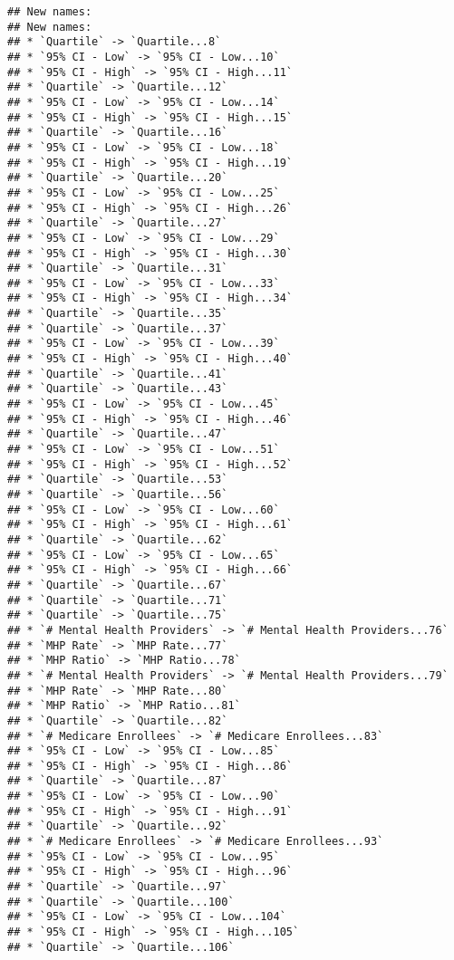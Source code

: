 \documentclass[
]{article}
\begin{document}
\begin{verbatim}
## New names:
## New names:
## * `Quartile` -> `Quartile...8`
## * `95% CI - Low` -> `95% CI - Low...10`
## * `95% CI - High` -> `95% CI - High...11`
## * `Quartile` -> `Quartile...12`
## * `95% CI - Low` -> `95% CI - Low...14`
## * `95% CI - High` -> `95% CI - High...15`
## * `Quartile` -> `Quartile...16`
## * `95% CI - Low` -> `95% CI - Low...18`
## * `95% CI - High` -> `95% CI - High...19`
## * `Quartile` -> `Quartile...20`
## * `95% CI - Low` -> `95% CI - Low...25`
## * `95% CI - High` -> `95% CI - High...26`
## * `Quartile` -> `Quartile...27`
## * `95% CI - Low` -> `95% CI - Low...29`
## * `95% CI - High` -> `95% CI - High...30`
## * `Quartile` -> `Quartile...31`
## * `95% CI - Low` -> `95% CI - Low...33`
## * `95% CI - High` -> `95% CI - High...34`
## * `Quartile` -> `Quartile...35`
## * `Quartile` -> `Quartile...37`
## * `95% CI - Low` -> `95% CI - Low...39`
## * `95% CI - High` -> `95% CI - High...40`
## * `Quartile` -> `Quartile...41`
## * `Quartile` -> `Quartile...43`
## * `95% CI - Low` -> `95% CI - Low...45`
## * `95% CI - High` -> `95% CI - High...46`
## * `Quartile` -> `Quartile...47`
## * `95% CI - Low` -> `95% CI - Low...51`
## * `95% CI - High` -> `95% CI - High...52`
## * `Quartile` -> `Quartile...53`
## * `Quartile` -> `Quartile...56`
## * `95% CI - Low` -> `95% CI - Low...60`
## * `95% CI - High` -> `95% CI - High...61`
## * `Quartile` -> `Quartile...62`
## * `95% CI - Low` -> `95% CI - Low...65`
## * `95% CI - High` -> `95% CI - High...66`
## * `Quartile` -> `Quartile...67`
## * `Quartile` -> `Quartile...71`
## * `Quartile` -> `Quartile...75`
## * `# Mental Health Providers` -> `# Mental Health Providers...76`
## * `MHP Rate` -> `MHP Rate...77`
## * `MHP Ratio` -> `MHP Ratio...78`
## * `# Mental Health Providers` -> `# Mental Health Providers...79`
## * `MHP Rate` -> `MHP Rate...80`
## * `MHP Ratio` -> `MHP Ratio...81`
## * `Quartile` -> `Quartile...82`
## * `# Medicare Enrollees` -> `# Medicare Enrollees...83`
## * `95% CI - Low` -> `95% CI - Low...85`
## * `95% CI - High` -> `95% CI - High...86`
## * `Quartile` -> `Quartile...87`
## * `95% CI - Low` -> `95% CI - Low...90`
## * `95% CI - High` -> `95% CI - High...91`
## * `Quartile` -> `Quartile...92`
## * `# Medicare Enrollees` -> `# Medicare Enrollees...93`
## * `95% CI - Low` -> `95% CI - Low...95`
## * `95% CI - High` -> `95% CI - High...96`
## * `Quartile` -> `Quartile...97`
## * `Quartile` -> `Quartile...100`
## * `95% CI - Low` -> `95% CI - Low...104`
## * `95% CI - High` -> `95% CI - High...105`
## * `Quartile` -> `Quartile...106`

\end{verbatim}
\end{document}
